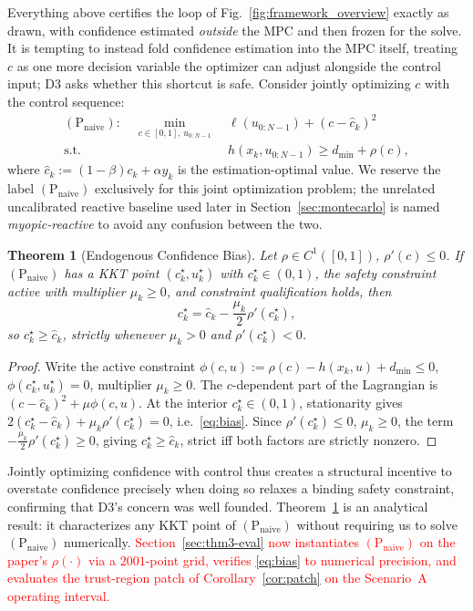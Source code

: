 \documentclass[letterpaper, 10 pt, conference]{ieeeconf}
\newtheorem{theorem}{Theorem}
\begin{document}
Everything above certifies the loop of Fig.~\ref{fig:framework_overview} exactly as drawn, with confidence estimated \emph{outside} the MPC and then frozen for the solve. It is tempting to instead fold confidence estimation into the MPC itself, treating $c$ as one more decision variable the optimizer can adjust alongside the control input; D3 asks whether this shortcut is safe. Consider jointly optimizing $c$ with the control sequence:
\begin{equation}
\begin{aligned}
(\mathrm P_{\mathrm{naive}}):\quad \min_{c\in[0,1],\,u_{0:N-1}} \ & \ell(u_{0:N-1}) + (c-\hat c_k)^2 \\
\text{s.t.}\ & h(x_k,u_{0:N-1}) \ge d_{\min}+\rho(c),
\end{aligned}
\label{eq:naive}
\end{equation}
where $\hat c_k:=(1-\beta)c_k+\alpha y_k$ is the estimation-optimal value. We reserve the label $(\mathrm P_{\mathrm{naive}})$ exclusively for this joint optimization problem; the unrelated uncalibrated reactive baseline used later in Section~\ref{sec:montecarlo} is named \emph{myopic-reactive} to avoid any confusion between the two.

\begin{theorem}[Endogenous Confidence Bias]
\label{thm:bias}
Let $\rho\in C^1([0,1])$, $\rho'(c)\le0$. If $(\mathrm P_{\mathrm{naive}})$ has a KKT point $(c_k^\star,u_k^\star)$ with $c_k^\star\in(0,1)$, the safety constraint active with multiplier $\mu_k\ge0$, and constraint qualification holds, then
\begin{equation}
c_k^\star = \hat c_k - \frac{\mu_k}{2}\rho'(c_k^\star), \label{eq:bias}
\end{equation}
so $c_k^\star \ge \hat c_k$, strictly whenever $\mu_k>0$ and $\rho'(c_k^\star)<0$.
\end{theorem}
\begin{proof}
Write the active constraint $\phi(c,u):=\rho(c)-h(x_k,u)+d_{\min}\le0$, $\phi(c_k^\star,u_k^\star)=0$, multiplier $\mu_k\ge0$. The $c$-dependent part of the Lagrangian is $(c-\hat c_k)^2+\mu\phi(c,u)$. At the interior $c_k^\star\in(0,1)$, stationarity gives $2(c_k^\star-\hat c_k)+\mu_k\rho'(c_k^\star)=0$, i.e.\ \eqref{eq:bias}. Since $\rho'(c_k^\star)\le0$, $\mu_k\ge0$, the term $-\tfrac{\mu_k}{2}\rho'(c_k^\star)\ge0$, giving $c_k^\star\ge\hat c_k$, strict iff both factors are strictly nonzero.
\end{proof}

Jointly optimizing confidence with control thus creates a structural incentive to overstate confidence precisely when doing so relaxes a binding safety constraint, confirming that D3's concern was well founded. Theorem~\ref{thm:bias} is an analytical result: it characterizes any KKT point of $(\mathrm P_{\mathrm{naive}})$ without requiring us to solve $(\mathrm P_{\mathrm{naive}})$ numerically. \textcolor{red}{Section~\ref{sec:thm3-eval} now instantiates $(\mathrm P_{\mathrm{naive}})$ on the paper's $\rho(\cdot)$ via a $2001$-point grid, verifies \eqref{eq:bias} to numerical precision, and evaluates the trust-region patch of Corollary~\ref{cor:patch} on the Scenario~A operating interval.}
\end{document}

